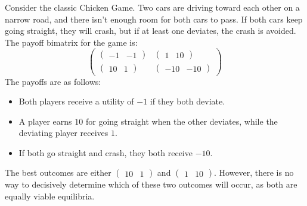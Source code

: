 \begin{example}
    Consider the classic Chicken Game. 
    Two cars are driving toward each other on a narrow road, and there isn't enough room for both cars to pass. 
    If both cars keep going straight, they will crash, but if at least one deviates, the crash is avoided.
    The payoff bimatrix for the game is:
    \[\begin{pmatrix} \begin{pmatrix} -1 & -1 \end{pmatrix} & \begin{pmatrix} 1 & 10 \end{pmatrix} \\ \begin{pmatrix} 10 & 1 \end{pmatrix} & \begin{pmatrix} -10 & -10 \end{pmatrix} \end{pmatrix}\]
    The payoffs are as follows:
    \begin{itemize}
        \item Both players receive a utility of $-1$ if they both deviate.
        \item A player earns $10$ for going straight when the other deviates, while the deviating player receives $1$.
        \item If both go straight and crash, they both receive $-10$.
    \end{itemize}

    The best outcomes are either $\begin{pmatrix} 10 & 1 \end{pmatrix}$ and $\begin{pmatrix} 1 & 10 \end{pmatrix}$.
    However, there is no way to decisively determine which of these two outcomes will occur, as both are equally viable equilibria.
\end{example}